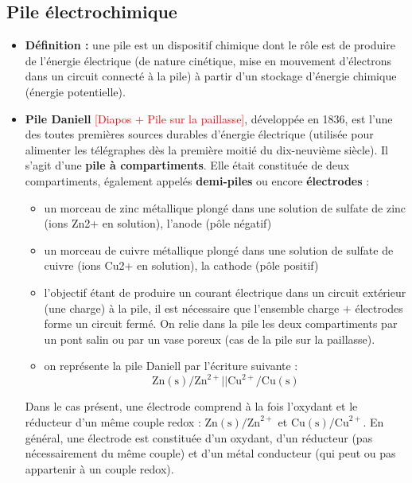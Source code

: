\documentclass[11pt,a4paper]{report}
\begin{document}
\subsection{Pile électrochimique}

\begin{itemize}
	\item \textbf{Définition :} une pile est un dispositif chimique dont le rôle est de produire de l'énergie électrique (de nature cinétique, mise en mouvement d'électrons dans un circuit connecté à la pile) à partir d'un stockage d'énergie chimique (énergie potentielle).\\

	\item \textbf{Pile Daniell} \textcolor{red}{[Diapos + Pile sur la paillasse]}, développée en 1836, est l'une des toutes premières sources durables d'énergie électrique (utilisée pour alimenter les télégraphes dès la première moitié du dix-neuvième siècle). Il s'agit d'une \textbf{pile à compartiments}. Elle était constituée de deux compartiments, également appelés \textbf{demi-piles} ou encore \textbf{électrodes} :
\begin{itemize}
	\item un morceau de zinc métallique plongé dans une solution de sulfate de zinc (ions Zn2+ en solution), l'anode (pôle négatif)
	\item un morceau de cuivre métallique plongé dans une solution de sulfate de cuivre (ions Cu2+ en solution), la cathode (pôle positif)
	\item l'objectif étant de produire un courant électrique dans un circuit extérieur (une charge) à la pile, il est nécessaire que l'ensemble charge $+$ électrodes forme un circuit fermé. On relie dans la pile les deux compartiments par un pont salin ou par un vase poreux (cas de la pile sur la paillasse).\\
	
	\item on représente la pile Daniell par l'écriture suivante :
	\begin{equation}
		\boxed{\text{Zn}(\text{s})/\text{Zn}^{2+} || \text{Cu}^{2+}/\text{Cu}(\text{s})}
	\end{equation}
\end{itemize}
	Dans le cas présent, une électrode comprend à la fois l'oxydant et le réducteur d'un même couple redox : $\text{Zn}(\text{s})/\text{Zn}^{2+}$ et $\text{Cu}(\text{s})/\text{Cu}^{2+}$. En général, une électrode est constituée d'un oxydant, d'un réducteur (pas nécessairement du même couple) et d'un métal conducteur (qui peut ou pas appartenir à un couple redox).\\
	

\end{itemize}
\end{document}
